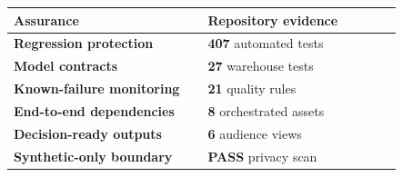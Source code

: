 \begin{tabular}{@{}p{0.46\linewidth}p{0.46\linewidth}@{}}
\toprule
Assurance & Repository evidence \\
\midrule
\textbf{Regression protection} & \textcolor{SignalTeal}{\textbf{407}} automated tests \\
\textbf{Model contracts} & \textcolor{SignalTeal}{\textbf{27}} warehouse tests \\
\textbf{Known-failure monitoring} & \textcolor{SignalTeal}{\textbf{21}} quality rules \\
\textbf{End-to-end dependencies} & \textcolor{SignalTeal}{\textbf{8}} orchestrated assets \\
\textbf{Decision-ready outputs} & \textcolor{SignalTeal}{\textbf{6}} audience views \\
\textbf{Synthetic-only boundary} & \textcolor{SignalTeal}{\textbf{PASS}} privacy scan \\
\bottomrule
\end{tabular}
